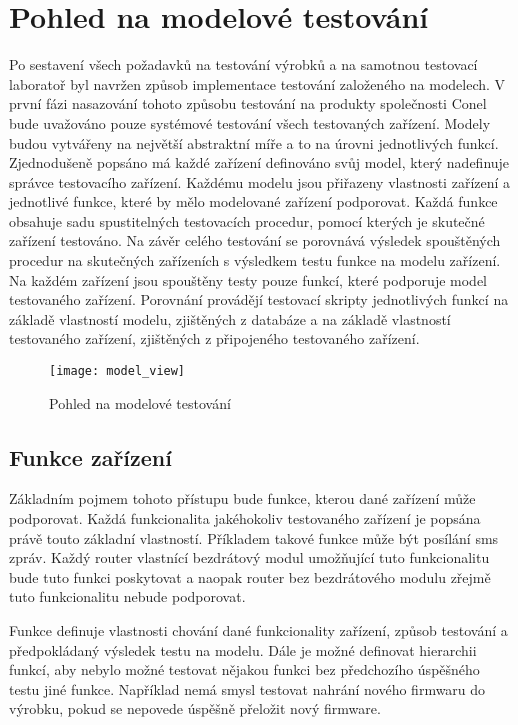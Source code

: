 \chapter{Pohled na modelové testování}
Po sestavení všech požadavků na testování výrobků a na samotnou testovací laboratoř byl navržen způsob implementace testování založeného na modelech. V první fázi nasazování tohoto způsobu testování na produkty společnosti Conel bude uvažováno pouze systémové testování všech testovaných zařízení. Modely budou vytvářeny na největší abstraktní míře a to na úrovni jednotlivých funkcí. Zjednodušeně popsáno má každé zařízení definováno svůj model, který nadefinuje správce testovacího zařízení. Každému modelu jsou přiřazeny vlastnosti zařízení a jednotlivé funkce, které by mělo modelované zařízení podporovat. Každá funkce obsahuje sadu spustitelných testovacích procedur, pomocí kterých je skutečné zařízení testováno. Na závěr celého testování se porovnává výsledek spouštěných procedur na skutečných zařízeních s výsledkem testu funkce na modelu zařízení. Na každém zařízení jsou spouštěny testy pouze funkcí, které podporuje model testovaného zařízení. Porovnání provádějí testovací skripty jednotlivých funkcí na základě vlastností modelu, zjištěných z databáze a na základě vlastností testovaného zařízení, zjištěných z připojeného testovaného zařízení.

\begin{figure}[h]
  \centering
  \texttt{[image: model\_view]}
  \caption{Pohled na modelové testování}
  \label{fig:model_view}
\end{figure}

\section{Funkce zařízení}
Základním pojmem tohoto přístupu bude funkce, kterou dané zařízení může podporovat. Každá funkcionalita jakéhokoliv testovaného zařízení je popsána právě touto základní vlastností. Příkladem takové funkce může být posílání sms zpráv. Každý router vlastnící bezdrátový modul umožňující tuto funkcionalitu bude tuto funkci poskytovat a naopak router bez bezdrátového modulu zřejmě tuto funkcionalitu nebude podporovat.

Funkce definuje vlastnosti chování dané funkcionality zařízení, způsob testování a předpokládaný výsledek testu na modelu. Dále je možné definovat hierarchii funkcí, aby nebylo možné testovat nějakou funkci bez předchozího úspěšného testu jiné funkce. Například nemá smysl testovat nahrání nového firmwaru do výrobku, pokud se nepovede úspěšně přeložit nový firmware.

